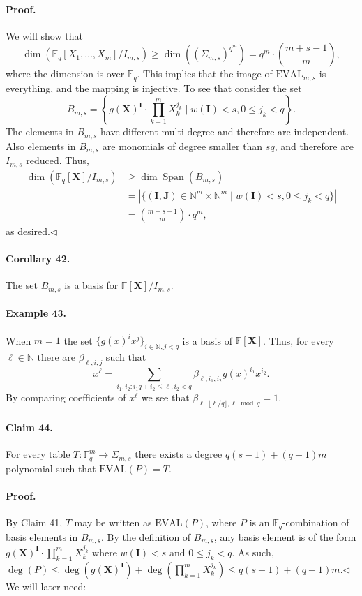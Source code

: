 \paragraph{Proof.} We will show that
\[\dim(\mathbb F_q[X_1,\ldots,X_m]/I_{m,s})\geq\dim((\Sigma_{m,s})^{q^m})=q^m\cdot\binom{m+s-1}{m},\]
where the dimension is over $\mathbb F_q$. This implies that the image of $\mathrm{EVAL}_{m,s}$ is everything, and the mapping is injective.
To see that consider the set
\[B_{m,s}=\left\{g(\boldsymbol X)^{\boldsymbol I}\cdot\prod_{k=1}^mX_k^{j_k}\mid w(\boldsymbol I)<s,0\leq j_k<q\right\}.\tag{5}\]
The elements in $B_{m,s}$ have different multi degree and therefore are independent. Also elements in $B_{m,s}$ are monomials of degree smaller than $sq$, and therefore are $I_{m,s}$ reduced. Thus,
\begin{align*}
\dim(\mathbb F_q[\boldsymbol X]/I_{m,s})&\geq\dim\operatorname{Span}(B_{m,s})\\
&=|\{(\boldsymbol I,\boldsymbol J)\in\mathbb N^m\times\mathbb N^m\mid w(\boldsymbol I)<s,0\leq j_k<q\}|\\
&=\binom{m+s-1}m\cdot q^m,
\end{align*}
as desired.\hfill$\triangleleft$
\paragraph{Corollary 42.} The set $B_{m,s}$ is a basis for $\mathbb F[\boldsymbol X]/I_{m,s}$.
\paragraph{Example 43.} When $m=1$ the set $\{g(x)^ix^j\}_{i\in\mathbb N,j<q}$ is a basis of $\mathbb F[\boldsymbol X]$. Thus, for every $\ell\in\mathbb N$ there are $\beta_{\ell,i,j}$ such that
\[x^\ell=\sum_{i_1,i_2:i_1q+i_2\leq\ell,i_2<q}\beta_{\ell,i_1,i_2}g(x)^{i_1}x^{i_2}.\]
By comparing coefficients of $x^\ell$ we see that $\beta_{\ell,\lfloor\ell/q\rfloor,\ell\bmod q}=1$.
\paragraph{Claim 44.} For every table $T:\mathbb F_q^m\to\Sigma_{m,s}$ there exists a degree $q(s-1)+(q-1)m$ polynomial such that $\mathrm{EVAL}(P)=T$.
\paragraph{Proof.} By Claim 41, $T$ may be written as $\mathrm{EVAL}(P)$, where $P$ is an $\mathbb F_q$-combination of basis elements in $B_{m,s}$. By the definition of $B_{m,s}$, any basis element is of the form $g(\boldsymbol X)^{\boldsymbol I}\cdot\prod_{k=1}^mX_k^{j_k}$ where $w(\boldsymbol I)<s$ and $0\leq j_k<q$. As such, $\deg(P)\leq\deg(g(\boldsymbol X)^{\boldsymbol I})+\deg(\prod_{k=1}^mX_k^{j_k})\leq q(s-1)+(q-1)m$.\hfill$\triangleleft$
We will later need:
